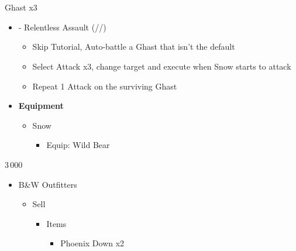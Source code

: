 \chapter[Chapter 3]{}

\renewcommand{\first}{[1] - Relentless Assault (\com/\rav/\rav)}
\begin{multicols}{2}

  \begin{battle}{Ghast x3}
    \begin{itemize}
      \item \first
            \begin{itemize}
              \item Skip Tutorial, Auto-battle a Ghast that isn't the default
              \item Select Attack x3, change target and execute when Snow starts to attack
              \item Repeat 1 Attack on the surviving Ghast
            \end{itemize}
    \end{itemize}
  \end{battle}
  \begin{menu}
    \begin{itemize}
      \item \textbf{Equipment}
            \begin{itemize}
              \item Snow
                    \begin{itemize}
                      \item Equip: Wild Bear
                    \end{itemize}
            \end{itemize}
    \end{itemize}
  \end{menu}
  \begin{shop}{3\,000}
    \begin{itemize}
      \item B\&W Outfitters
            \begin{itemize}
              \item Sell
                    \begin{itemize}
                      \item Items
                            \begin{itemize}
                              \item Phoenix Down x2
                            \end{itemize}

\end{itemize}
\end{itemize}
\end{itemize}
\end{shop}
\end{multicols}
